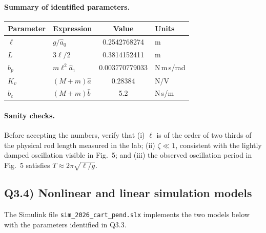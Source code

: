 \documentclass[11pt,a4paper]{article}
\renewcommand{\l}{\ell}
\begin{document}
\paragraph{Summary of identified parameters.}
\begin{center}
\begin{tabular}{|l|l|c|l|}
\hline
\textbf{Parameter} & \textbf{Expression} & \textbf{Value} & \textbf{Units}\\
\hline
$\l$   & $g/\hat a_0$        & 0.2542768274 & m \\ \hline
$L$    & $3\l/2$             & 0.3814152411 & m \\ \hline
$b_p$  & $m\l^{2}\hat a_1$   & 0.003770779033 & N\,m\,s/rad \\ \hline
$K_v$  & $(M+m)\hat a$       & 0.28384 & N/V \\ \hline
$b_c$  & $(M+m)\hat b$       & 5.2 & N\,s/m \\ \hline
\end{tabular}
\end{center}

\paragraph{Sanity checks.} Before accepting the numbers, verify that
(i) $\l$ is of the order of two thirds of the physical rod length measured
in the lab; (ii) $\zeta \ll 1$, consistent with the lightly damped
oscillation visible in Fig.~5; and (iii) the observed oscillation period in
Fig.~5 satisfies $T \approx 2\pi\sqrt{\l/g}$.

\subsection*{Q3.4) Nonlinear and linear simulation models}

The Simulink file \texttt{sim\_2026\_cart\_pend.slx} implements the two
models below with the parameters identified in Q3.3.
\end{document}
